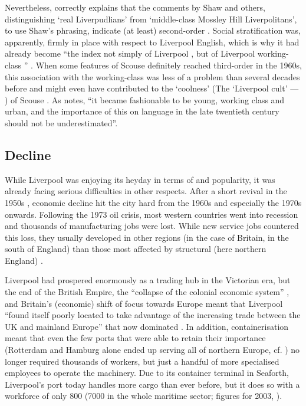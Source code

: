 Nevertheless, \citeauthor{crowley2012} correctly explains that the comments by Shaw and others, distinguishing `real Liverpudlians' from `middle-class Mossley Hill Liverpolitans', to use Shaw's phrasing, indicate (at least) second-order . Social stratification was, apparently, firmly in place with respect to Liverpool English, which is why it had already become ``the index not simply of Liverpool , but of Liverpool working-class '' \citep[107]{crowley2012}.
When some features of Scouse definitely reached third-order  in the 1960s, this association with the working-class was less of a problem than several decades before and might even have contributed to the `coolness' (The `Liverpool cult' --- \citealt[109]{crowley2012}) of Scouse .
As \citet[165]{wales2006} notes, ``it became fashionable to be young, working class and urban, and the importance of this on language  in the late twentieth century should not be underestimated''.

		\subsection{Decline}\label{sec.hist.20.decline}

While Liverpool was enjoying its heyday in terms of  and popularity, it was already facing serious difficulties in other respects. After a short revival in the 1950s \citep[cf.][402]{murden2006}, economic decline hit the city hard from the 1960s and especially the 1970s onwards.
Following the 1973 oil crisis, most western countries went into recession and thousands of manufacturing jobs were lost.
While new service jobs countered this loss, they usually developed in other regions (in the case of Britain, in the south of England) than those most affected by structural  (here northern England) \citep[cf.][16--17]{juddparkinson1990a}.

Liverpool had prospered enormously as a trading hub in the Victorian era, but the end of the British Empire, the ``collapse of the colonial economic system'' \citep[52]{belchem2006a}, and Britain's (economic) shift of focus towards Europe meant that Liverpool ``found itself poorly located to take advantage of the increasing trade between the UK and mainland Europe'' that now dominated \citep[166--167]{couch2003a}.
In addition, containerisation meant that even the few ports that were able to retain their importance (Rotterdam and Hamburg alone ended up serving all of northern Europe, cf. \citealt[264]{milne2006}) no longer required thousands of workers, but just a handful of more specialised employees to operate the machinery.
Due to its container terminal in Seaforth, Liverpool's port today handles more cargo than ever before, but it does so with a workforce of only 800 (7000 in the whole maritime sector; figures for 2003, \citealt[cf.][477]{murden2006}).

